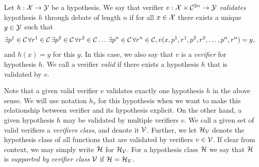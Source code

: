 \documentclass[anon]{alt2027} %
\begin{document}
\begin{definition}
Let $h:{\mathcal X}\to{\mathcal Y}$ be a hypothesis. We say that verifier $v: {\mathcal X}\times {{\mathcal C}}^{2n} \to {\mathcal Y}$ \emph{validates} hypothesis $h$ through debate of length $n$ if for all $x\in{\mathcal X}$ there exists a unique $y\in {\mathcal Y}$ such that
\begin{align*}
\exists{p}^1\in{{\mathcal C}}\,\forall{r}^1\in{{\mathcal C}}\,\exists{p}^2\in{{\mathcal C}}\,\forall {r}^2\in{{\mathcal C}}\ldots\,\exists{p}^n\in{{\mathcal C}}\,\forall{r}^n\in{{\mathcal C}},
v(x, {p}^1, {r}^1, {p}^2, {r}^2, \ldots,  {p}^n, {r}^n) = y,
\end{align*}
and $h(x) = y$ for this $y$. 
In this case, we also say that $v$ is a \emph{verifier} for hypothesis $h$. We call a verifier \emph{valid} if there exists a hypothesis $h$ that is validated by $v$.
\end{definition}

Note that a given valid verifier $v$ validates exactly one hypothesis $h$ in the above sense. We will use notation $h_v$ for this hypothesis when we want to make this relationship between verifier and its hypothesis explicit. On the other hand, a given hypothesis $h$ may be validated by multiple verifiers $v$.
We call a given set of valid verifiers a \emph{verifiers class}, and denote it ${\mathcal V}$. Further, we let ${{\mathcal H}}_{\mathcal V}$ denote the hypothesis class of all functions that are validated by verifiers $v\in{\mathcal V}$. If clear from context, we may simply write ${{\mathcal H}}$ for ${{\mathcal H}}_{\mathcal V}$.
For a hypothesis class ${{\mathcal H}}$ we say that ${{\mathcal H}}$ is \emph{supported by verifier class} ${\mathcal V}$ if ${{\mathcal H}} = {{\mathcal H}}_{\mathcal V}$.
\end{document}
